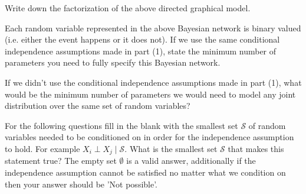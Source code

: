 \documentclass[11pt,addpoints,answers]{exam}
\begin{document}
\begin{questions}
\question[1] Write down the factorization of the above directed graphical model.

\begin{tcolorbox}[fit,height=1cm, width=15cm, blank, borderline={1pt}{-2pt},nobeforeafter]
\end{tcolorbox}

\question[1] Each random variable represented in the above Bayesian network is binary valued (i.e. either the event happens or it does not). If we use the same conditional independence assumptions made in part (1), state the minimum number of parameters you need to fully specify  this Bayesian network.

\begin{tcolorbox}[fit,height=1cm, width=2cm, blank, borderline={1pt}{-2pt},nobeforeafter]
\end{tcolorbox}


\question[1] If we didn't use the conditional independence assumptions made in part (1), what would be the minimum number of parameters we would need to model any joint distribution over the same set of random variables?

\begin{tcolorbox}[fit,height=1cm, width=2cm, blank, borderline={1pt}{-2pt},nobeforeafter]
\end{tcolorbox}



\newpage
\question[5] For the following questions fill in the blank with the smallest set $\mathcal{S}$ of random variables needed to be conditioned on in order for the independence assumption to hold. For example $X_i \perp X_j \mid \mathcal{S}$. What is the smallest set $\mathcal{S}$ that makes this statement true? The empty set $\emptyset$ is a valid answer, additionally if the independence assumption cannot be satisfied no matter what we condition on then your answer should be 'Not possible'.
\end{questions}
\end{document}

